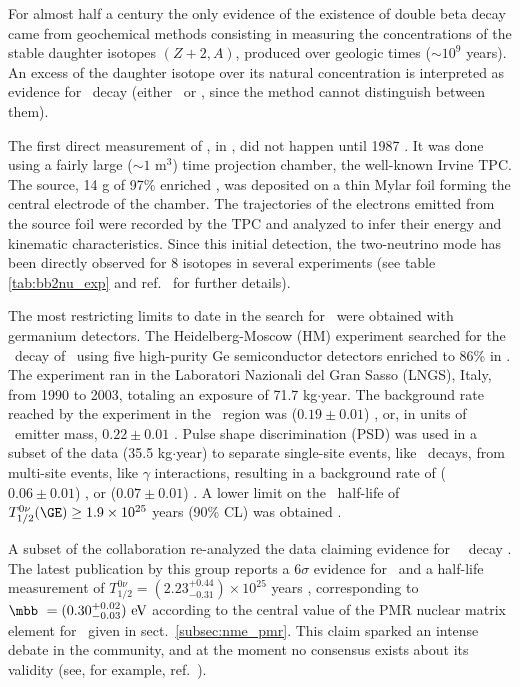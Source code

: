 For almost half a century the only evidence of the existence of double beta decay came from geochemical methods consisting in measuring the concentrations of the stable daughter isotopes $(Z+2,A)$, produced over geologic times ($\sim 10^9$ years). An excess of the daughter isotope over its natural concentration is interpreted as evidence for \bb\ decay (either \bbtnu\ or \bbonu, since the method cannot distinguish between them).

The first direct measurement of \bbtnu, in \SE, did not happen until 1987 \cite{Elliott:1987kp}. It was done using a fairly large ($\sim1$ m$^{3}$) time projection chamber, the well-known Irvine TPC. The source, 14 g of 97\% enriched \SE, was deposited on a thin Mylar foil forming the central electrode of the chamber. The trajectories of the electrons emitted from the source foil were recorded by the TPC and analyzed to infer their energy and kinematic characteristics. Since this initial detection, the two-neutrino mode has been directly observed for 8 isotopes in several experiments (see table \ref{tab:bb2nu_exp} and ref.~\cite{Barabash:2010ie} for further details).

The most restricting limits to date in the search for \bbonu\ were obtained with germanium detectors. The Heidelberg-Moscow (HM) experiment \cite{Klapdor-Kleingrothaus:2000eir} searched for the \bbonu\ decay of \GE\ using five high-purity Ge semiconductor detectors enriched to 86\% in \GE. The experiment ran in the Laboratori Nazionali del Gran Sasso (LNGS), Italy, from 1990 to 2003, totaling an exposure of 71.7 kg$\cdot$year. The background rate reached by the experiment in the \Qbb\ region was ($0.19\pm 0.01$) \ckky, or, in units of \bb\ emitter mass, $0.22\pm 0.01$ \ckkbby. Pulse shape discrimination (PSD) was used in a subset of the data (35.5 kg$\cdot$year) to separate single-site events, like \bbonu\ decays, from multi-site events, like $\gamma$ interactions, resulting in a background rate of ($0.06\pm 0.01$) \ckky, or ($0.07\pm 0.01$) \ckkbby. A lower limit on the \bbonu\ half-life of $T^{0\nu}_{1/2}(\GE) \geq 1.9 \times 10^{25}$ years (90\% CL) was obtained \cite{Klapdor-Kleingrothaus:2000eir}.

A subset of the collaboration re-analyzed the data claiming evidence for \GE\ \bbonu\ decay \cite{Klapdor-Kleingrothaus:2001oba}. The latest publication by this group reports a $6\sigma$ evidence for \bbonu\ and a half-life measurement of $T_{1/2}^{0\nu}=(2.23^{+0.44}_{-0.31})\times 10^{25}$ years \cite{Klapdor-Kleingrothaus:2006zcr}, corresponding to $\mbb\ = (0.30^{+0.02}_{-0.03})\ \text{eV}$ according to the central value of the PMR nuclear matrix element for \GE\ given in sect.~\ref{subsec:nme_pmr}. This claim sparked an intense debate in the community, and at the moment no consensus exists about its validity (see, for example, ref.~\cite{Aalseth:2002dt}).

